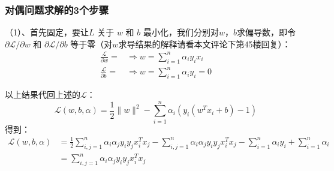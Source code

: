 \documentclass[a4paper,12pt]{article}
\begin{document}
\subsubsection{对偶问题求解的3个步骤}
（1）、首先固定，要让$ L$ 关于 $w$ 和 $b$ 最小化，我们分别对$w$，$b$求偏导数，即令 $\partial\mathcal{L}/\partial w$ 和 $\partial\mathcal{L}/\partial b$ 等于零（对$w$求导结果的解释请看本文评论下第45楼回复）：
\begin{equation}
  \begin{split}
    \frac{\mathcal{L}}{\partial w}= &\Rightarrow w=\sum_{i=1}^n\alpha_iy_ix_i\\
    \frac{\mathcal{L}}{\partial b}= &\Rightarrow w=\sum_{i=1}^n\alpha_iy_i=0
  \end{split}
\end{equation}

以上结果代回上述的$\mathcal{L}$：
\begin{equation}
  \mathcal{L}(w,b,\alpha)=\frac{1}{2}\|w\|^2-\sum_{i=1}^n\alpha_i\left(y_i(w^Tx_i+b)-1\right)
\end{equation}
得到：
\begin{equation}
  \begin{split}
    \mathcal{L}(w,b,\alpha)&=\frac{1}{2}\sum_{i,j=1}^n\alpha_i\alpha_jy_iy_jx_i^Tx_j-\sum_{i,j=1}^n\alpha_i\alpha_jy_iy_jx_i^Tx_j-\sum_{i=1}^n\alpha_iy_i+\sum_{i=1}^n\alpha_i\\
    &=\sum_{i,j=1}^n\alpha_i\alpha_jy_iy_jx_i^Tx_j
  \end{split}
\end{equation}
\end{document}
